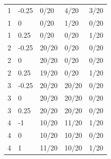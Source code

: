 \begin{tabular}{lllll}
1 & -0.25 & 0/20 & 4/20 & 3/20 \\
1 & 0 & 0/20 & 1/20 & 0/20 \\
1 & 0.25 & 0/20 & 0/20 & 1/20 \\
2 & -0.25 & 20/20 & 0/20 & 0/20 \\
2 & 0 & 20/20 & 0/20 & 0/20 \\
2 & 0.25 & 19/20 & 0/20 & 1/20 \\
3 & -0.25 & 20/20 & 20/20 & 0/20 \\
3 & 0 & 20/20 & 20/20 & 0/20 \\
3 & 0.25 & 20/20 & 20/20 & 0/20 \\
4 & -1 & 10/20 & 11/20 & 1/20 \\
4 & 0 & 10/20 & 10/20 & 0/20 \\
4 & 1 & 11/20 & 10/20 & 1/20 \\
\end{tabular}
